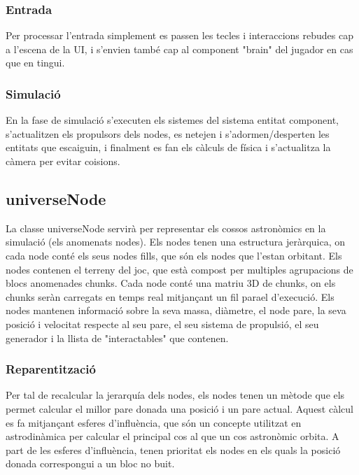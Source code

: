 \subsubsection{Entrada}
Per processar l'entrada simplement es passen les tecles i interaccions rebudes cap a l'escena de la UI, i s'envien també cap al component "brain" del jugador en cas que en tingui.
\subsubsection{Simulació}
En la fase de simulació s'executen els sistemes del sistema entitat component, s'actualitzen els propulsors dels nodes, es netejen i s'adormen/desperten les entitats que escaiguin, i finalment es fan els càlculs de física i s'actualitza la càmera per evitar co\lgem isions.
\subsection{universeNode}
La classe universeNode servirà per representar els cossos astronòmics en la simulació (els anomenats nodes). Els nodes tenen una estructura jeràrquica, on cada node conté els seus nodes fills, que són els nodes que l'estan orbitant.
Els nodes contenen el terreny del joc, que està compost per multiples agrupacions de blocs anomenades chunks. 
Cada node conté una matriu 3D de chunks, on els chunks seràn carregats en temps real mitjançant un fil para\lgem el d'execució.
Els nodes mantenen informació sobre la seva massa, diàmetre, el node pare, la seva posició i velocitat respecte al seu pare, el seu sistema de propulsió, el seu generador i la llista de "interactables" que contenen.
\subsubsection{Reparentització}
Per tal de recalcular la jerarquía dels nodes, els nodes tenen un mètode que els permet calcular el millor pare donada una posició i un pare actual. Aquest càlcul es fa mitjançant esferes d'influència, que són un concepte utilitzat en astrodinàmica per calcular el principal cos al que un cos astronòmic orbita. A part de les esferes d'influència, tenen prioritat els nodes en els quals la posició donada correspongui a un bloc no buit.
